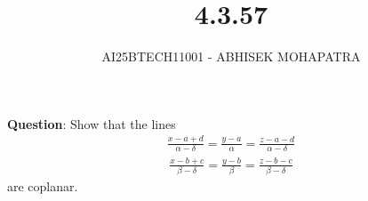 \documentclass[journal,12pt,onecolumn]{IEEEtran}
\begin{document}
\title{4.3.57}
\author{AI25BTECH11001 - ABHISEK MOHAPATRA}
{\let\newpage\relax\maketitle}
	 	\textbf{Question}:
		Show that the lines
		\begin{align}
\frac{x-a+d}{\alpha-\delta}=\frac{y-a}{\alpha}=\frac{z-a-d}{\alpha-\delta}
		\end{align}
		\begin{align}
		\frac{x-b+c}{\beta-\delta}=\frac{y-b}{\beta}=\frac{z-b-c}{\beta-\delta}
		\end{align}
are coplanar.
	
\end{document}
